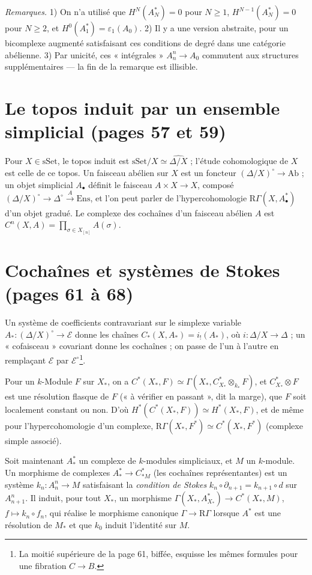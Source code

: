 \documentclass[11pt,a4paper]{article}
\begin{document}
\emph{Remarques.} 1) On n'a utilisé que $H^N(A^*_N) = 0$ pour $N \geq 1$,
$H^{N-1}(A^*_N) = 0$ pour $N \geq 2$, et $H^0(A^*_1) = \varepsilon_1(A_0)$.
2) Il y a une version abstraite, pour un bicomplexe augmenté satisfaisant ces
conditions de degré dans une catégorie abélienne. 3) Par unicité, ces
« intégrales » $A^n_n \to A_0$ commutent aux structures supplémentaires — la
fin de la remarque est illisible.

\section*{Le topos induit par un ensemble simplicial (pages 57 et 59)}

Pour $X \in \mathrm{sSet}$, le topos induit est $\mathrm{sSet}/X \simeq
\widehat{\Delta/X}$ ; l'étude cohomologique de $X$ est celle de ce topos. Un
faisceau abélien sur $X$ est un foncteur $(\Delta/X)^\circ \to \mathrm{Ab}$ ;
un objet simplicial $A_\bullet$ définit le faisceau $A \times X \to X$, composé
$(\Delta/X)^\circ \to \Delta^\circ \xrightarrow{A} \mathrm{Ens}$, et l'on peut
parler de l'hypercohomologie $\mathrm{R}\Gamma(X, A^*_\bullet)$ d'un objet
gradué. Le complexe des cochaînes d'un faisceau abélien $A$ est
$C^n(X, A) = \prod_{\sigma \in X_{[n]}} A(\sigma)$.

\section*{Cochaînes et systèmes de Stokes (pages 61 à 68)}

Un système de coefficients contravariant sur le simplexe variable
$A_* : (\Delta/X)^\circ \to \mathcal{E}$ donne les chaînes
$C_*(X, A_*) = i_!(A_*)$, où $i : \Delta/X \to \Delta$ ; un « cofaisceau »
covariant donne les cochaînes ; on passe de l'un à l'autre en remplaçant
$\mathcal{E}$ par $\mathcal{E}^\circ$\footnote{La moitié supérieure de la page
61, biffée, esquisse les mêmes formules pour une fibration $C \to B$.}.

Pour un $k$-Module $F$ sur $X_*$, on a $C^*(X_*, F) \simeq \Gamma(X_*,
C^*_{X_*} \otimes_{k_*} F)$, et $C^*_{X_*} \otimes F$ est une résolution
flasque de $F$ (« à vérifier en passant », dit la marge), que $F$ soit
localement constant ou non. D'où $H^*(C^*(X_*, F)) \simeq H^*(X_*, F)$, et
de même pour l'hypercohomologie d'un complexe, $\mathrm{R}\Gamma(X_*, F^*)
\simeq C^*(X_*, F^*)$ (complexe simple associé).

Soit maintenant $A^*_*$ un complexe de $k$-modules simpliciaux, et $M$ un
$k$-module. Un morphisme de complexes $A^*_* \to C^*_{*M}$ (les cochaînes
représentantes) est un système $k_n : A^n_n \to M$ satisfaisant la
\emph{condition de Stokes} $k_n \circ \partial_{n+1} = k_{n+1} \circ d$ sur
$A^n_{n+1}$. Il induit, pour tout $X_*$, un morphisme $\Gamma(X_*, A^*_{X_*})
\to C^*(X_*, M)$, $f \mapsto k_n \circ f_n$, qui réalise le morphisme canonique
$\Gamma \to \mathrm{R}\Gamma$ lorsque $A^*$ est une résolution de $M_*$ et que
$k_0$ induit l'identité sur $M$.
\end{document}
